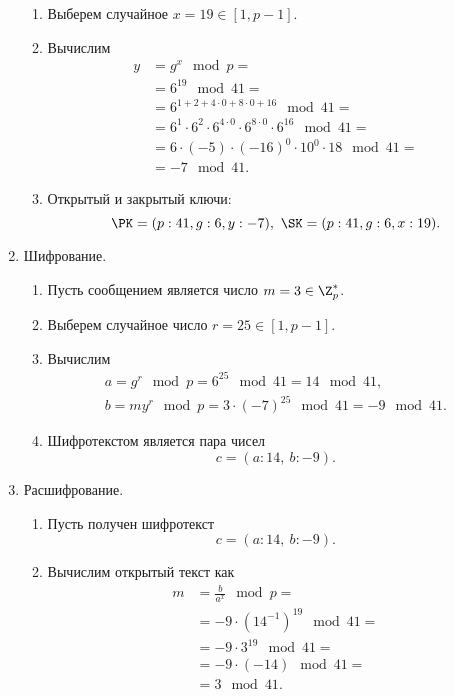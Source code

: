 \begin{enumerate}
\begin{enumerate}
            \item Выберем случайное $x = 19 \in [1, p-1]$.
            \item Вычислим
                \[ \begin{array}{ll}
                    y & = g^x \mod p = \\
                    & = 6^{19} \mod 41 = \\
                    & = 6^{1 + 2 + 4 \cdot 0 + 8 \cdot 0 + 16} \mod 41 = \\
                    & = 6^1 \cdot 6^2 \cdot 6^{4 \cdot 0} \cdot 6^{8 \cdot 0} \cdot 6^{16} \mod 41 = \\
                    & = 6 \cdot (-5) \cdot (-16)^0 \cdot 10^0 \cdot 18 \mod 41 = \\
                    & = -7 \mod 41.
                \end{array} \]
            \item Открытый и закрытый ключи:
                \[ \PK = (p:41, g:6, y:-7), ~ \SK = (p:41, g:6, x:19). \]
        \end{enumerate}
    \item Шифрование.
        \begin{enumerate}
            \item Пусть сообщением является число $m = 3 \in \Z_p^*$.
            \item Выберем случайное число $r = 25 \in [1, p-1]$.
            \item Вычислим
                \[ \begin{array}{l}
                    a = g^r \mod p = 6^{25} \mod 41 = 14 \mod 41, \\
                    b = m y^r \mod p = 3 \cdot (-7)^{25} \mod 41 = -9 \mod 41.
                \end{array} \]
            \item Шифротекстом является пара чисел
                \[ c = (a:14, ~ b:-9). \]
        \end{enumerate}
    \item Расшифрование.
        \begin{enumerate}
            \item Пусть получен шифротекст
                \[ c = (a:14, ~ b:-9). \]
            \item Вычислим открытый текст как
                \[ \begin{array}{ll}
                    m & = \frac{b}{a^x} \mod p = \\
                    & = -9 \cdot (14^{-1})^{19} \mod 41 = \\
                    & = -9 \cdot 3^{19} \mod 41 = \\
                    & = -9 \cdot (-14) \mod 41 = \\
                    & = 3 \mod 41. \\
                \end{array} \]
        \end{enumerate}
\end{enumerate}

